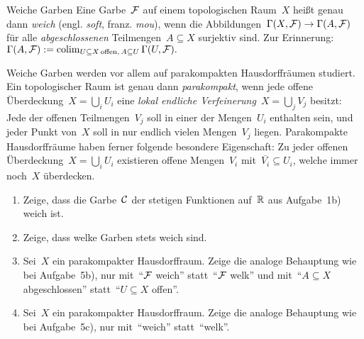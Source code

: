 \documentclass{uebblatt}
\begin{document}
\begin{aufgabe}{Weiche Garben}
Eine Garbe~$\mathcal{F}$ auf einem topologischen Raum~$X$ heißt genau dann \emph{weich}
(engl. \emph{soft}, franz. \emph{mou}), wenn die Abbildungen~$\Gamma(X,\mathcal{F}) \to
\Gamma(A,\mathcal{F})$ für alle \emph{abgeschlossenen} Teilmengen~$A \subseteq X$
surjektiv sind. Zur Erinnerung:~$\Gamma(A,\mathcal{F}) := \operatorname{colim}\limits_{{U \subseteq
X\,\text{offen},\,A \subseteq U}} \Gamma(U,\mathcal{F}).$

Weiche Garben werden vor allem auf parakompakten Hausdorffräumen studiert. Ein
topologischer Raum ist genau dann \emph{parakompakt}, wenn jede offene
Überdeckung~$X = \bigcup_i U_i$ eine \emph{lokal endliche Verfeinerung}~$X =
\bigcup_j V_j$ besitzt: Jede der offenen Teilmengen~$V_j$ soll in einer der
Mengen~$U_i$ enthalten sein, und jeder Punkt von~$X$ soll in nur endlich
vielen Mengen~$V_j$ liegen. Parakompakte Hausdorffräume haben ferner folgende
besondere Eigenschaft: Zu jeder offenen Überdeckung~$X = \bigcup_i U_i$
existieren offene Mengen~$V_i$ mit~$\overline{V_i} \subseteq U_i$, welche immer
noch~$X$ überdecken.

\begin{enumerate}
\item Zeige, dass die Garbe~$\mathcal{C}$ der stetigen Funktionen auf~$\mathbb{R}$ aus
Aufgabe~1b) weich ist.
\item Zeige, dass welke Garben stets weich sind.
\item Sei~$X$ ein parakompakter Hausdorffraum. Zeige die analoge Behauptung wie
bei Aufgabe~5b), nur mit~"`$\mathcal{F}$ weich"' statt~"`$\mathcal{F}$ welk"' und mit~"`$A
\subseteq X$ abgeschlossen"' statt~"`$U \subseteq X$ offen"'.
\item Sei~$X$ ein parakompakter Hausdorffraum. Zeige die analoge Behauptung wie
bei Aufgabe~5c), nur mit~"`weich"' statt~"`welk"'.
\end{enumerate}
\end{aufgabe}
\end{document}
